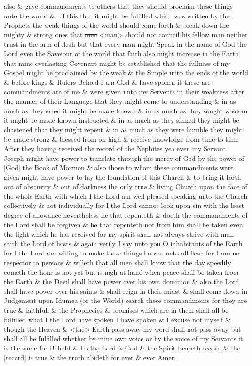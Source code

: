 {also \sout{\&} gave commandments to others that they should proclaim these things unto the world \& all this that it might be fulfilled which was written by the Prophets the weak things of the world should come forth \& break down the mighty \& strong ones that \sout{men} <man> should not council his fellow man neither trust in the arm of flesh but that every man might Speak in the name of God the Lord even the Saveiour of the world that faith also might increase in the Earth that mine everlasting Covenant might be established that the fullness of my Gospel might be proclaimed by the weak \& the Simple unto the ends of the world \& before kings \& Rulers Behold I am God \& have spoken it these \sout{are} commandments are of me \& were given unto my Servents in their weakness after the manner of their Language that they might come to understanding \& in as much as they erred it might be made known \& in as much as they sought wisdom it might be \sout{made known} instructed \& in as much as they sinned they might be chastened that they might repent \& in as much as they were humble they might be made strong \& blessed from on high \& receive knowledge from time to time After they having received the record of the Nephites yea even my Servant Joseph might have power to translate through the mercy of God by the power of [God] the Book of Mormon \& also those to whom these commandments were given might have power to lay the foundation of this Church \& to bring it forth out of obscurity \& out of darkness the only true \& living Church upon the face of the whole Earth with which I the Lord am well pleased speaking unto the Church collectively \& not individually for I the Lord cannot look upon sin with the least degree of allowance nevertheless he that repenteth \& doeth the commandments of the Lord shall be forgiven \& he that repenteth not from him shall be taken even the light which he has received for my spirit shall not always strive with man saith the Lord of hosts \& again verily I say unto you O inhabitants of the Earth for I the Lord am willing to make these things known unto all flesh for I am no respector to persons \& willeth that all men shall know that the day speedily cometh the hour is not yet but is nigh at hand when peace shall be taken from the Earth \& the Devil shall have power over his own dominion \& also the Lord shall have power over his saints \& shall reign in their midst \& shall come down in Judgement upon Idumea (or the World) search these commandments for they are true \& faithfull \& the Prophecies \& promises which are in them shall all be fulfilled what I the Lord have spoken I have spoken \& I excuse not myself \& though the Heaven \& <the> Earth pass away my word shall not pass away but shall all be fulfilled whether by mine own voice or by the voice of my Servants it is the same for Behold \& Lo the Lord is God \& the Spirit beareth record \& the [record] is true \& the truth abideth for ever \& ever Amen
				
}
